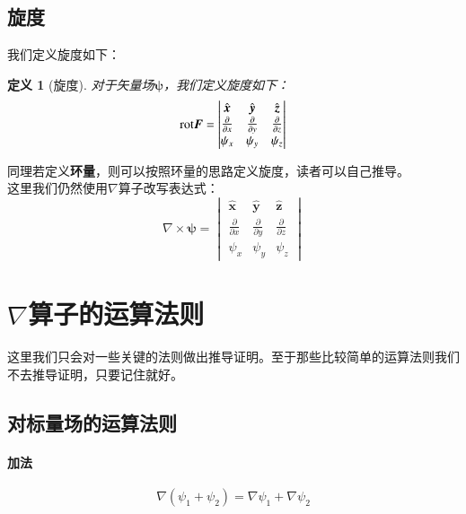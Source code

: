 \documentclass[12pt,a4paper]{ctexart}
\newtheorem{definition}{\indent 定义}[section]
\renewcommand*{\bf}[1]{\boldsymbol{#1}}
\newcommand*{\hatbf}[1]{\hat{\bf{#1}}}
\newcommand*{\rot}{\textbf{\rm{rot}}}
\numberwithin{equation}{section}
\begin{document}
            \subsection{旋度}
            我们定义旋度如下：
            \begin{definition}[旋度]
                对于矢量场$\bf{\psi}$，我们定义旋度如下：
                \begin{equation}
                    \rot \bf{F} = 
                    \begin{vmatrix}
                        \hatbf{x} & \hatbf{y} & \hatbf{z} \\
                        \frac{\partial}{\partial x} & \frac{\partial}{\partial y} & \frac{\partial}{\partial z} \\
                        \psi_x & \psi_y & \psi_z
                    \end{vmatrix}
                    \label{eq8}
                \end{equation}
            \end{definition}
            同理若定义\textbf{环量}，则可以按照环量的思路定义旋度，读者可以自己推导。\\
            这里我们仍然使用$\nabla$算子改写表达式：
            \begin{equation}
                \nabla \times \bf{\psi} = 
                \begin{vmatrix}
                    \hatbf{x} & \hatbf{y} & \hatbf{z} \\
                        \frac{\partial}{\partial x} & \frac{\partial}{\partial y} & \frac{\partial}{\partial z} \\
                        \psi_x & \psi_y & \psi_z
                \end{vmatrix}
                \label{eq9}
            \end{equation}

        \section{$\nabla$算子的运算法则}
        这里我们只会对一些关键的法则做出推导证明。至于那些比较简单的运算法则我们不去推导证明，只要记住就好。
            \subsection{对标量场的运算法则}
                \paragraph*{加法}
                    \begin{equation}
                        \nabla (\psi_1 + \psi_2) = \nabla \psi_1 + \nabla \psi_2 \label{eq10}
                    \end{equation}
\end{document}
